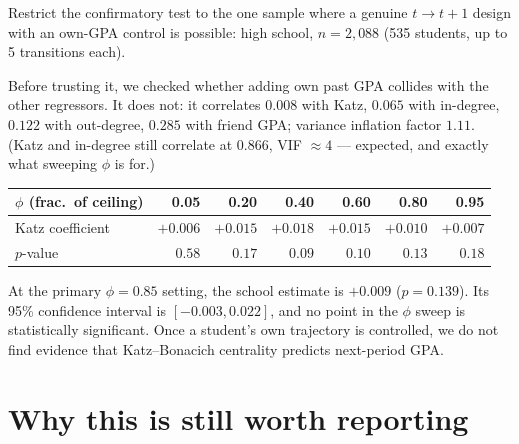 \documentclass[11pt]{article}
\begin{document}
Restrict the confirmatory test to the one sample where a genuine $t \to t+1$ design
with an own-GPA control is possible: high school, $n=2{,}088$ (535 students, up to 5
transitions each).

Before trusting it, we checked whether adding own past GPA collides with the other
regressors. It does not: it correlates $0.008$ with Katz, $0.065$ with in-degree,
$0.122$ with out-degree, $0.285$ with friend GPA; variance inflation factor $1.11$.
(Katz and in-degree still correlate at $0.866$, VIF $\approx 4$ --- expected, and
exactly what sweeping $\phi$ is for.)

\begin{center}
\begin{tabular}{lrrrrrr}
$\phi$ (frac.\ of ceiling) & 0.05 & 0.20 & 0.40 & 0.60 & 0.80 & 0.95 \\
\hline
Katz coefficient & $+0.006$ & $+0.015$ & $+0.018$ & $+0.015$ & $+0.010$ & $+0.007$ \\
$p$-value & $0.58$ & $0.17$ & $0.09$ & $0.10$ & $0.13$ & $0.18$ \\
\end{tabular}
\end{center}

At the primary $\phi=0.85$ setting, the school estimate is $+0.009$ ($p=0.139$).
Its 95\% confidence interval is $[-0.003, 0.022]$, and no point in the $\phi$ sweep
is statistically significant.
Once a student's own trajectory is controlled, we do not find evidence that
Katz--Bonacich centrality predicts next-period GPA.

\begin{center}
\end{center}

\section*{Why this is still worth reporting}
\end{document}
